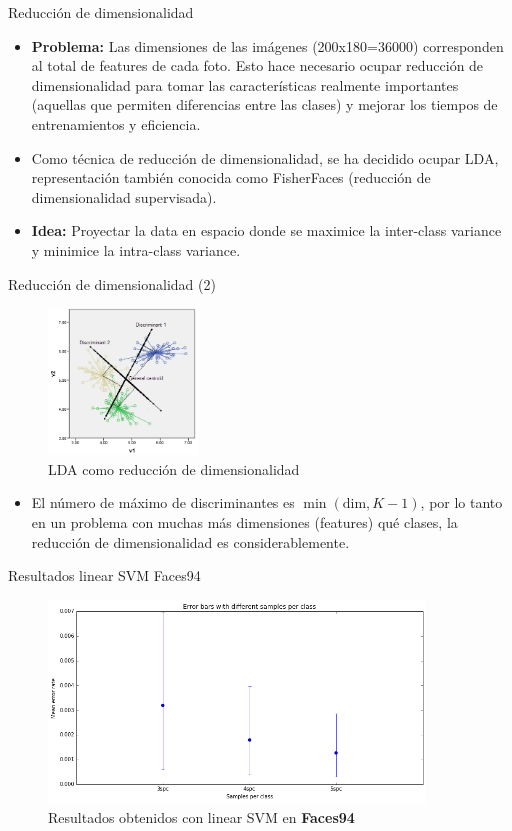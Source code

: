 \documentclass{beamer}
\begin{document}
\begin{frame}{Reducción de dimensionalidad}
\begin{itemize}
    \item \textbf{Problema:} Las dimensiones de las imágenes (200x180=36000) corresponden al total de features de cada foto. Esto hace necesario ocupar reducción de dimensionalidad para tomar las características realmente importantes (aquellas que permiten diferencias entre las clases) y mejorar los tiempos de entrenamientos y eficiencia.
    \item Como técnica de reducción de dimensionalidad, se ha decidido ocupar LDA, representación también conocida como FisherFaces (reducción de dimensionalidad supervisada).
    \item \textbf{Idea:} Proyectar la data en espacio donde se maximice la inter-class variance y minimice la intra-class variance.
\end{itemize}
\end{frame}


\begin{frame}{Reducción de dimensionalidad (2)}
\begin{figure}[htpb!]
\centering
\includegraphics[width=4cm]{fisherfaces}
\caption{LDA como reducción de dimensionalidad}
\end{figure}

\begin{itemize}
    \item El número de máximo de discriminantes es $\min(\text{dim},K-1)$, por lo tanto en un problema con muchas más dimensiones (features) qué clases, la reducción de dimensionalidad es considerablemente.
\end{itemize}
\end{frame}

\begin{frame}{Resultados linear SVM Faces94}
\begin{figure}[htpb!]
\centering
\includegraphics[width=10cm]{lsvm_res94}
\caption{Resultados obtenidos con linear SVM en \textbf{Faces94}}
\end{figure}
\end{frame}
\end{document}
